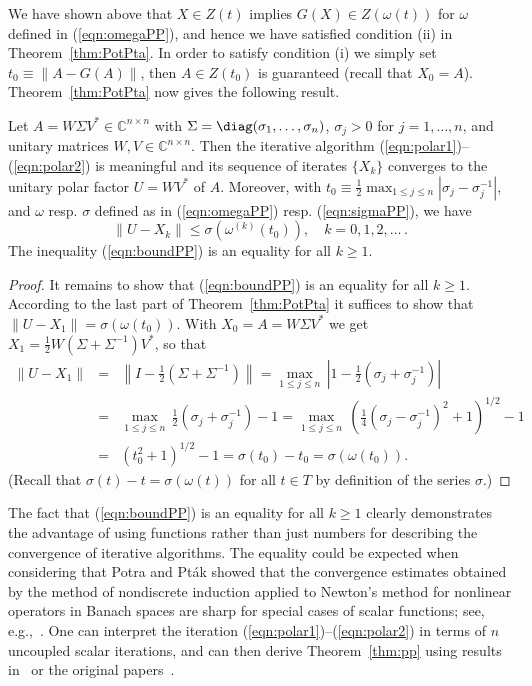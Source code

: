 \documentclass{siamltex}
\begin{document}
We have shown above that $X\in Z(t)$ implies $G(X)\in Z(\omega(t))$ for $\omega$ defined in
(\ref{eqn:omegaPP}), and hence we have satisfied condition (ii) in Theorem~\ref{thm:PotPta}.
In order to satisfy condition (i) we simply set $t_0\equiv \|A-G(A)\|$, then $A\in Z(t_0)$
is guaranteed (recall that $X_0=A$). Theorem~\ref{thm:PotPta} now gives the following result.

\medskip
\begin{theorem}\label{thm:pp}
Let $A=W\Sigma V^*\in {\mathbb C}^{n\times n}$ with $\Sigma={\diag}(\sigma_1,\dots,\sigma_n)$,
$\sigma_j>0$ for  $j=1,\dots,n$, and unitary matrices $W,V\in {\mathbb C}^{n\times n}$.
Then the iterative algorithm (\ref{eqn:polar1})--(\ref{eqn:polar2}) is meaningful and its
sequence of iterates $\{X_k\}$ converges to the unitary polar factor $U=WV^*$ of $A$. Moreover,
with $t_0\equiv \frac12\max_{1\leq j\leq n} |\sigma_j-\sigma_j^{-1}|$,
and $\omega$ resp. $\sigma$ defined as in (\ref{eqn:omegaPP}) resp. (\ref{eqn:sigmaPP}), we have
\begin{equation}\label{eqn:boundPP}
\|U-X_k\|\leq \sigma(\omega^{(k)}(t_0)),\quad k=0,1,2,\dots\,.
\end{equation}
The inequality (\ref{eqn:boundPP}) is an equality for all $k\geq 1$.
\end{theorem}

\medskip
\begin{proof}
It remains to show that (\ref{eqn:boundPP}) is an equality for all $k\geq 1$. According to the
last part of Theorem~\ref{thm:PotPta} it suffices to show that $\|U-X_1\|=\sigma(\omega(t_0))$.
With $X_0=A=W\Sigma V^*$ we get $X_1=\frac12 W(\Sigma+\Sigma^{-1})V^*$, so that
\begin{eqnarray*}
\|U-X_1\|&=&\left\|I-\frac12 (\Sigma+\Sigma^{-1})\right\|=\max_{1\leq j\leq n}\,
\left|1-\frac12 (\sigma_j+\sigma_j^{-1})\right|\\
&=& \max_{1\leq j\leq n}\,\frac12 (\sigma_j+\sigma_j^{-1})-1
=\max_{1\leq j\leq n}\,\left(\frac14 (\sigma_j-\sigma_j^{-1})^2+1\right)^{1/2}-1\\
&=& (t_0^2+1)^{1/2}-1 = \sigma(t_0)-t_0 = \sigma(\omega(t_0)).
\end{eqnarray*}
(Recall that $\sigma(t)-t=\sigma(\omega(t))$ for all $t\in T$ by definition of the series $\sigma$.)
\end{proof}

\medskip
The fact that (\ref{eqn:boundPP}) is an equality for all $k\geq 1$ clearly demonstrates the advantage 
of using functions rather than just numbers for describing the convergence of iterative algorithms. 
The equality could be expected when considering that Potra and Pt\'ak showed that the convergence 
estimates obtained by the method of nondiscrete induction applied to Newton's method for nonlinear 
operators in Banach spaces are sharp for special cases of scalar functions; see,
e.g.,~\cite[Proposition~5.10]{PotPtaBook84}. One can interpret the iteration
(\ref{eqn:polar1})--(\ref{eqn:polar2}) in terms of $n$ uncoupled scalar iterations, and can then
derive Theorem~\ref{thm:pp} using results in~\cite[Chapter~5]{PotPtaBook84} or the original
papers~\cite{PotPta80,Pta76b}.
\end{document}
